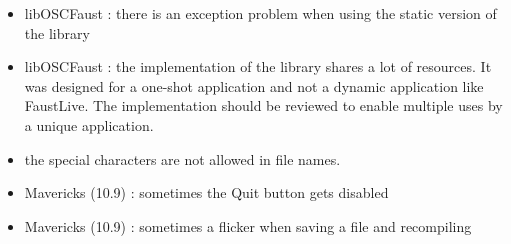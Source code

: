 \documentclass[a4paper]{article}
\begin{document}
\begin{itemize}
\item libOSCFaust : there is an exception problem when using the static version of the library
\item libOSCFaust : the implementation of the library shares a lot of resources. It was designed for a one-shot application and not a dynamic application like FaustLive. The implementation should be reviewed to enable multiple uses by a unique application. 
\item the special characters are not allowed in file names.
\item Mavericks (10.9) : sometimes the Quit button gets disabled
\item Mavericks (10.9) : sometimes a flicker when saving a file and recompiling
\end{itemize}
\end{document}

